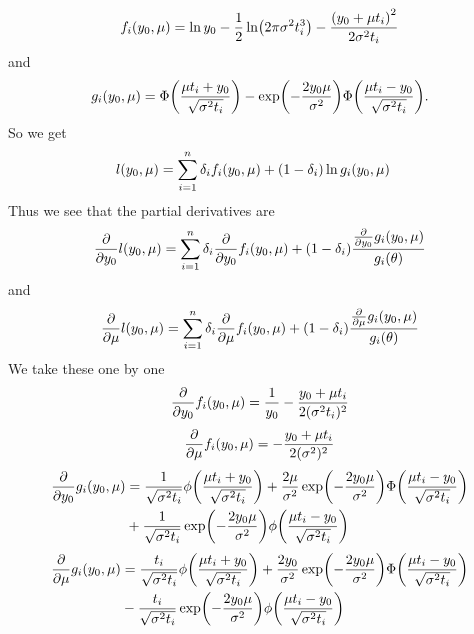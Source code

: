 \begin{equation}
f_i(y_0,\mu)=\ln y_0-\frac{1}{2}\ln\p*{2\pi\sigma^2\ti^3}-\frac{\p*{y_0+\mu\ti}^2}{2\sigma^2\ti}
\end{equation}
and
\begin{equation}
g_i(y_0,\mu)=\Phi\p*{\frac{\mu\ti+y_0}{\sqrt{\sigma^2\ti}}}-\exp\p*{-\frac{2y_0\mu}{\sigma^2}}\Phi\p*{\frac{\mu\ti-y_0}{\sqrt{\sigma^2\ti}}}.
\end{equation}
So we get
\begin{align}
    l(y_0,\mu)&=\sum_{i=1}^n\delta_{i} f_i(y_0,\mu)+(1-\delta_{i})\ln{g_i(y_0,\mu)}
\end{align}
Thus we see that the partial derivatives are
\begin{equation}
    \frac{\partial}{\partial y_0}l(y_0,\mu)=\sum_{i=1}^n\delta_{i} \frac{\partial}{\partial y_0}f_i(y_0,\mu)+(1-\delta_{i})\frac{\frac{\partial}{\partial y_0}g_i(y_0,\mu)}{g_i(\theta)}
\end{equation}
and
\begin{equation}
    \frac{\partial}{\partial \mu}l(y_0,\mu)=\sum_{i=1}^n\delta_{i} \frac{\partial}{\partial \mu}f_i(y_0,\mu)+(1-\delta_{i})\frac{\frac{\partial}{\partial \mu}g_i(y_0,\mu)}{g_i(\theta)}
\end{equation}
We take these one by one
\begin{equation}
    \frac{\partial}{\partial y_0}f_i(y_0,\mu)=\frac{1}{y_0}-\frac{y_0+\mu t_{i}}{2(\sigma^2t_{i})^2}
\end{equation}
\begin{equation}
    \frac{\partial}{\partial \mu}f_i(y_0,\mu)=-\frac{y_0+\mu t_{i}}{2(\sigma^2)^2}
\end{equation}
\begin{align}
\begin{split}
    \frac{\partial}{\partial y_0}g_i(y_0,\mu)&=\frac{1}{\sqrt{\sigma^2\ti}}\phi\p*{\frac{\mu\ti+y_0}{\sqrt{\sigma^2\ti}}}+\frac{2\mu}{\sigma^2}\exp\p*{-\frac{2y_0\mu}{\sigma^2}}\Phi\p*{\frac{\mu\ti-y_0}{\sqrt{\sigma^2\ti}}} \\
    &+
    \frac{1}{\sqrt{\sigma^2\ti}}\exp\p*{-\frac{2y_0\mu}{\sigma^2}}\phi\p*{\frac{\mu\ti-y_0}{\sqrt{\sigma^2\ti}}}
\end{split}
\end{align}
\begin{align}
\begin{split}
    \frac{\partial}{\partial \mu}g_i(y_0,\mu)&=\frac{\ti}{\sqrt{\sigma^2\ti}}\phi\p*{\frac{\mu\ti+y_0}{\sqrt{\sigma^2\ti}}}+\frac{2y_0}{\sigma^2}\exp\p*{-\frac{2y_0\mu}{\sigma^2}}\Phi\p*{\frac{\mu\ti-y_0}{\sqrt{\sigma^2\ti}}} \\
    &-
    \frac{\ti}{\sqrt{\sigma^2\ti}}\exp\p*{-\frac{2y_0\mu}{\sigma^2}}\phi\p*{\frac{\mu\ti-y_0}{\sqrt{\sigma^2\ti}}}
\end{split}
\end{align}
